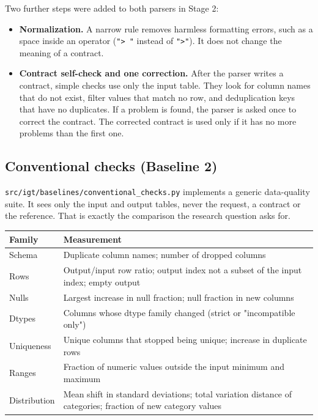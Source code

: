 \documentclass[11pt]{article}
\providecommand{\tightlist}{\setlength{\itemsep}{0pt}\setlength{\parskip}{0pt}}
\begin{document}
Two further steps were added to both parsers in Stage 2:

\begin{itemize}
\tightlist
\item
  \textbf{Normalization.} A narrow rule removes harmless formatting
  errors, such as a space inside an operator (\texttt{"> "} instead of
  \texttt{">"}). It does not change the meaning of a contract.
\item
  \textbf{Contract self-check and one correction.} After the parser
  writes a contract, simple checks use only the input table. They look
  for column names that do not exist, filter values that match no row,
  and deduplication keys that have no duplicates. If a problem is found,
  the parser is asked once to correct the contract. The corrected
  contract is used only if it has no more problems than the first one.
\end{itemize}

\subsection{Conventional checks (Baseline 2)}

\texttt{src/\allowbreak{}igt/\allowbreak{}baselines/\allowbreak{}conventional\_\allowbreak{}checks.\allowbreak{}py}
implements a generic data-quality suite. It sees only the input and
output tables, never the request, a contract or the reference. That is
exactly the comparison the research question asks for.

\vspace{4pt}\begin{center}
\footnotesize\setlength{\tabcolsep}{3pt}\renewcommand{\arraystretch}{1.1}
\begin{tabularx}{\columnwidth}{l>{\raggedright\arraybackslash}X}
\toprule
\textbf{Family} & \textbf{Measurement} \\
\midrule
Schema & Duplicate column names; number of dropped columns \\
Rows & Output/input row ratio; output index not a subset of the input index; empty output \\
Nulls & Largest increase in null fraction; null fraction in new columns \\
Dtypes & Columns whose dtype family changed (strict or "incompatible only") \\
Uniqueness & Unique columns that stopped being unique; increase in duplicate rows \\
Ranges & Fraction of numeric values outside the input minimum and maximum \\
Distribution & Mean shift in standard deviations; total variation distance of categories; fraction of new category values \\
\bottomrule
\end{tabularx}
\end{center}\vspace{2pt}
\end{document}
